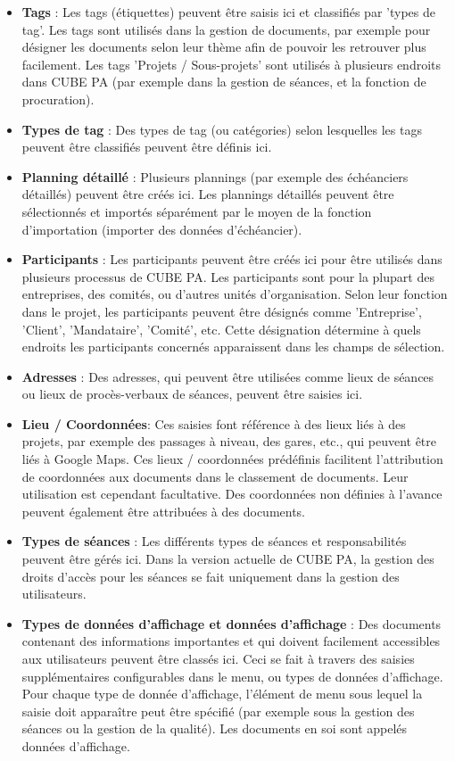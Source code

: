 \begin{itemize}
\item
\textbf{Tags} : Les tags (étiquettes) peuvent être saisis ici et classifiés par 'types de tag'. Les tags sont utilisés dans la gestion de documents, par exemple pour désigner les documents selon leur thème afin de pouvoir les retrouver plus facilement. 
Les tags 'Projets / Sous-projets' sont utilisés à plusieurs endroits dans CUBE PA (par exemple dans la gestion de séances, et la fonction de procuration).
\item
\textbf{Types de tag} : Des types de tag (ou catégories) selon lesquelles les tags peuvent être classifiés 
peuvent être définis ici.
\item
\textbf{Planning détaillé} : Plusieurs plannings (par exemple des échéanciers détaillés) peuvent être créés ici. Les plannings détaillés peuvent être sélectionnés et importés séparément par le moyen de la fonction d'importation (importer des données d'échéancier).
\item
\textbf{Participants} : Les participants peuvent être créés ici pour être utilisés dans plusieurs processus de CUBE PA. Les participants sont pour la plupart des entreprises, des comités, ou d'autres unités d'organisation. Selon leur fonction dans le projet, les participants peuvent être désignés comme 'Entreprise', 'Client', 'Mandataire', 'Comité', etc. Cette désignation détermine à quels endroits les participants concernés apparaissent dans les champs de sélection.
\item
\textbf{Adresses} : Des adresses, qui peuvent être utilisées comme lieux de séances ou lieux de procès-verbaux de séances, peuvent être saisies ici.
\item
\textbf{Lieu / Coordonnées}: Ces saisies font référence à des lieux liés à des projets, par exemple des passages à niveau, des gares, etc., qui peuvent être liés à Google Maps. Ces lieux / coordonnées prédéfinis facilitent l'attribution de coordonnées aux documents dans le classement de documents. Leur utilisation est cependant facultative. Des coordonnées non définies à l'avance peuvent également être attribuées à des documents.
\item
\textbf{Types de séances} : Les différents types de séances et responsabilités peuvent être gérés ici. Dans la version actuelle de CUBE PA, la gestion des droits d'accès pour les séances se fait uniquement dans la gestion des utilisateurs.
\item
\textbf{Types de données d'affichage et données d'affichage} : Des documents contenant des informations importantes et qui doivent facilement accessibles aux utilisateurs peuvent être classés ici. Ceci se fait à travers des saisies supplémentaires configurables dans le menu, ou types de données d'affichage. Pour chaque type de donnée d'affichage, l'élément de menu sous lequel la saisie doit apparaître peut être spécifié (par exemple sous la gestion des séances ou la gestion de la qualité). Les documents en soi sont appelés données d'affichage. 

\end{itemize}
